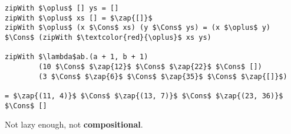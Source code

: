 \begin{frame}[t,fragile]
\vspace{35pt}


\begin{lstlisting}[mathescape=true,numbers=none]
zipWith $\oplus$ [] ys = []
zipWith $\oplus$ xs [] = $\zap{[]}$
zipWith $\oplus$ (x $\Cons$ xs) (y $\Cons$ ys) = (x $\oplus$ y) $\Cons$ (zipWith $\textcolor{red}{\oplus}$ xs ys)

zipWith $\lambda$ab.(a + 1, b + 1)
        (10 $\Cons$ $\zap{12}$ $\Cons$ $\zap{22}$ $\Cons$ [])
        (3 $\Cons$ $\zap{6}$ $\Cons$ $\zap{35}$ $\Cons$ $\zap{[]}$)

= $\zap{(11, 4)}$ $\Cons$ $\zap{(13, 7)}$ $\Cons$ $\zap{(23, 36)}$ $\Cons$ []
\end{lstlisting}

\vspace{5pt}
Not lazy enough, not \textbf{compositional}.

\end{frame}
